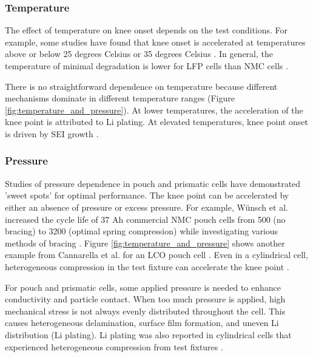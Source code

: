 \documentclass[journal=jpcl, manuscript=article, layout=onecolumn]{achemso}
\begin{document}
\subsubsection{Temperature}
The effect of temperature on knee onset depends on the test conditions. For example, some studies have found that knee onset is accelerated at temperatures above or below 25 degrees Celsius \cite{zhang_accelerated_2019, waldmann_temperature_2014, waldmann_optimization_2015} or 35 degrees Celsius \cite{schuster_nonlinear_2015}. In general, the temperature of minimal degradation is lower for LFP cells than NMC cells \cite{preger_degradation_2020}. 

There is no straightforward dependence on temperature because different mechanisms dominate in different temperature ranges (Figure \ref{fig:temperature_and_pressure}). At lower temperatures, the acceleration of the knee point is attributed to Li plating. At elevated temperatures, knee point onset is driven by SEI growth \cite {zhang_accelerated_2019,schuster_nonlinear_2015,waldmann_temperature_2014,waldmann_optimization_2015}.

\subsubsection{Pressure}
Studies of pressure dependence in pouch and prismatic cells have demonstrated 'sweet spots' for optimal performance. The knee point can be accelerated by either an absence of pressure or excess pressure. For example, Wünsch et al. increased the cycle life of 37 Ah commercial NMC pouch cells from 500 (no bracing) to 3200 (optimal spring compression) while investigating various methods of bracing \cite{wunsch_investigation_2019}. Figure \ref{fig:temperature_and_pressure} shows another example from Cannarella et al. for an LCO pouch cell \cite{cannarella_stress_2014}. Even in a cylindrical cell, heterogeneous compression in the test fixture can accelerate the knee point \cite{bach_nonlinear_2016}. 

For pouch and prismatic cells, some applied pressure is needed to enhance conductivity and particle contact. When too much pressure is applied, high mechanical stress is not always evenly distributed throughout the cell. This causes heterogeneous delamination, surface film formation, and uneven Li distribution (Li plating). Li plating was also reported in cylindrical cells that experienced heterogeneous compression from test fixtures \cite{bach_nonlinear_2016}. 
\end{document}
